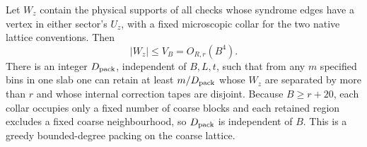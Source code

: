 Let \(W_z\) contain the physical supports of all checks whose
syndrome edges have a vertex in either sector's \(U_z\), with a
fixed microscopic collar for the two native lattice conventions.
Then
\begin{equation}\label{eq:protected-volume}
 |W_z|\le V_B=O_{R,r}(B^4).
\end{equation}
There is an integer \(D_{\rm pack}\), independent of \(B,L,t\),
such that from any \(m\) specified bins in one slab one can retain
at least \(m/D_{\rm pack}\) whose \(W_z\) are separated by more
than \(r\) and whose internal correction tapes are disjoint.
Because \(B\ge r+20\), each collar occupies only a fixed number of
coarse blocks and each retained region excludes a fixed coarse
neighbourhood, so \(D_{\rm pack}\) is independent of \(B\).
This is a greedy bounded-degree packing on the coarse lattice.

